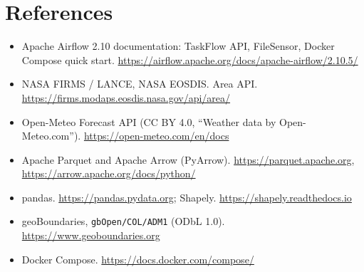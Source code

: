 \documentclass[11pt,a4paper]{article}
\newcommand{\code}[1]{\texttt{\small #1}}
\begin{document}
\section*{References}
\begin{itemize}
  \item Apache Airflow 2.10 documentation: TaskFlow API, FileSensor, Docker Compose quick start.
        \url{https://airflow.apache.org/docs/apache-airflow/2.10.5/}
  \item NASA FIRMS / LANCE, NASA EOSDIS. Area API. \url{https://firms.modaps.eosdis.nasa.gov/api/area/}
  \item Open-Meteo Forecast API (CC BY 4.0, ``Weather data by Open-Meteo.com'').
        \url{https://open-meteo.com/en/docs}
  \item Apache Parquet and Apache Arrow (PyArrow). \url{https://parquet.apache.org},
        \url{https://arrow.apache.org/docs/python/}
  \item pandas. \url{https://pandas.pydata.org}; Shapely. \url{https://shapely.readthedocs.io}
  \item geoBoundaries, \code{gbOpen/COL/ADM1} (ODbL 1.0). \url{https://www.geoboundaries.org}
  \item Docker Compose. \url{https://docs.docker.com/compose/}
\end{itemize}
\end{document}
